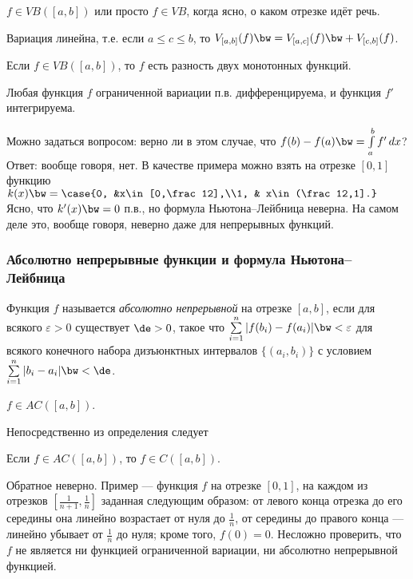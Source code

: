 \documentclass[10pt]{article}
\newcommand{\ve}{\varepsilon}
\begin{document}
\begin{denote}
$f\in VB([a,b])$ или просто $f\in VB$, когда ясно, о каком отрезке
идёт речь.
\end{denote}

\begin{problem}
Вариация линейна, т.е. если $a\le c\le b$, то $V_{[a,b]}(f)\bw
=V_{[a,c]}(f)\bw +V_{[c,b]}(f)$.
\end{problem}

\begin{problem}\label{bounded_variation}
Если $f\in VB([a,b])$, то $f$ есть разность двух монотонных функций.
\end{problem}

\begin{theorem}\label{bound_var_diff}
Любая функция $f$ ограниченной вариации п.в. дифференцируема, и
функция $f'$ интегрируема.
\end{theorem}

Можно задаться вопросом: верно ли в этом случае, что $f(b)-f(a)\bw =
\int\limits_a^bf'\,dx$? Ответ: вообще говоря, нет. В качестве
примера можно взять на отрезке $[0,1]$ функцию $k(x)\bw =\case{0,
&x\in[0,\frac12],\\1, & x\in(\frac12,1].}$ Ясно, что $k'(x)\bw =0$
п.в., но формула Ньютона--Лейбница неверна. На самом деле это,
вообще говоря, неверно даже для непрерывных функций.

\subsubsection{Абсолютно непрерывные функции и формула
Ньютона--Лейбница}

\begin{df}
Функция $f$ называется\emph{ абсолютно непрерывной} на отрезке
$[a,b]$, если для всякого $\ve>0$ существует $\de>0$, такое что
$\sum\limits_{i=1}^n|f(b_i)-f(a_i)|\bw <\ve$ для всякого конечного
набора дизъюнктных интервалов $\{(a_i,b_i)\}$ с условием
$\sum\limits_{i=1}^n|b_i-a_i|\bw <\de$.
\end{df}
\begin{denote}
$f\in AC([a,b])$.
\end{denote}

Непосредственно из определения следует

\begin{stm}
Если $f\in AC([a,b])$, то $f\in C([a,b])$.
\end{stm}

\begin{note}
Обратное неверно. Пример --- функция $f$ на отрезке $[0,1]$, на
каждом из отрезков $[\frac1{n+1},\frac1n]$ заданная следующим
образом: от левого конца отрезка до его середины она линейно
возрастает от нуля до $\frac1n$, от середины до правого конца ---
линейно убывает от $\frac1n$ до нуля; кроме того, $f(0)=0$. Несложно
проверить, что $f$ не является ни функцией ограниченной вариации, ни
абсолютно непрерывной функцией.
\end{note}
\end{document}
